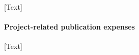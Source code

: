 \documentclass[a4paper,12pt]{article}
\begin{document}
[Text]

\paragraph{Project-related publication expenses}

[Text]















\end{document}
